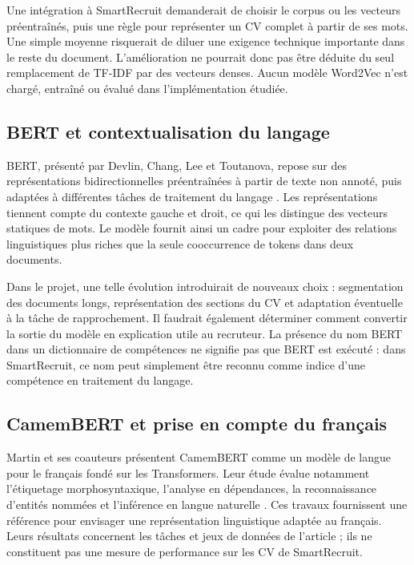 Une intégration à SmartRecruit demanderait de choisir le corpus ou les vecteurs préentraînés, puis une règle pour représenter un CV complet à partir de ses mots. Une simple moyenne risquerait de diluer une exigence technique importante dans le reste du document. L'amélioration ne pourrait donc pas être déduite du seul remplacement de TF-IDF par des vecteurs denses. Aucun modèle Word2Vec n'est chargé, entraîné ou évalué dans l'implémentation étudiée.

\subsection{BERT et contextualisation du langage}

BERT, présenté par Devlin, Chang, Lee et Toutanova, repose sur des représentations bidirectionnelles préentraînées à partir de texte non annoté, puis adaptées à différentes tâches de traitement du langage \cite{devlin2019}. Les représentations tiennent compte du contexte gauche et droit, ce qui les distingue des vecteurs statiques de mots. Le modèle fournit ainsi un cadre pour exploiter des relations linguistiques plus riches que la seule cooccurrence de tokens dans deux documents.

Dans le projet, une telle évolution introduirait de nouveaux choix : segmentation des documents longs, représentation des sections du CV et adaptation éventuelle à la tâche de rapprochement. Il faudrait également déterminer comment convertir la sortie du modèle en explication utile au recruteur. La présence du nom BERT dans un dictionnaire de compétences ne signifie pas que BERT est exécuté : dans SmartRecruit, ce nom peut simplement être reconnu comme indice d'une compétence en traitement du langage.

\subsection{CamemBERT et prise en compte du français}

Martin et ses coauteurs présentent CamemBERT comme un modèle de langue pour le français fondé sur les Transformers. Leur étude évalue notamment l'étiquetage morphosyntaxique, l'analyse en dépendances, la reconnaissance d'entités nommées et l'inférence en langue naturelle \cite{martin2020}. Ces travaux fournissent une référence pour envisager une représentation linguistique adaptée au français. Leurs résultats concernent les tâches et jeux de données de l'article ; ils ne constituent pas une mesure de performance sur les CV de SmartRecruit.


